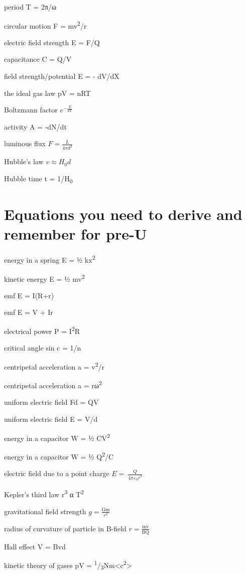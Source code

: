 \documentclass[main.tex]{subfiles}
\begin{document}
period T = 2π/ω

circular motion F = mv\textsuperscript{2}/r

electric field strength E = F/Q

capacitance C = Q/V

field strength/potential E = - dV/dX

the ideal gas law pV = nRT

Boltzmann factor \(e^{- \frac{E}{\text{kT}}}\)

activity A = -dN/dt

luminous flux \(F = \frac{L}{4\pi d^{2}}\)

Hubble's law \(v \approx H_{0}d\)

Hubble time t = 1/H\textsubscript{0}

\section{Equations you need to derive and remember for pre-U}

energy in a spring E = ½ kx\textsuperscript{2}

kinetic energy E = ½ mv\textsuperscript{2}

emf E = I(R+r)

emf E = V + Ir

electrical power P = I\textsuperscript{2}R

critical angle sin c = 1/n

centripetal acceleration a = v\textsuperscript{2}/r

centripetal acceleration a = rω\textsuperscript{2}

uniform electric field Fd = QV

uniform electric field E = V/d

energy in a capacitor W = ½ CV\textsuperscript{2 }

energy in a capacitor W = ½ Q\textsuperscript{2}/C

electric field due to a point charge
\(E = \ \frac{Q}{{4\pi\varepsilon_{0}r}^{2}}\)

Kepler's third law r\textsuperscript{3} α T\textsuperscript{2}

gravitational field strength \(g = \frac{\text{Gm}}{r^{2}}\)

radius of curvature of particle in B-field
\(r = \frac{\text{mv}}{\text{BQ}}\)

Hall effect V = Bvd

kinetic theory of gases pV =
\textsuperscript{1}/\textsubscript{3}Nm\textless{}c\textsuperscript{2}\textgreater{}
\end{document}
